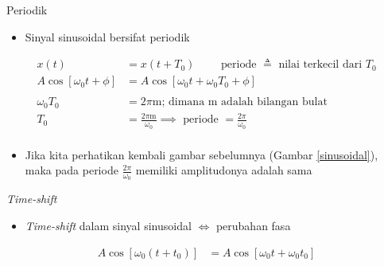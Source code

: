 \documentclass[aspectratio=169]{beamer}
\begin{document}
\begin{frame}{Periodik}
	\begin{itemize}
		\item Sinyal sinusoidal bersifat periodik
	\end{itemize}
	\begin{align*}
		x(t) &= x(t+T_0) \qquad \text{ periode } \triangleq \text{ nilai terkecil dari } T_0 \\
		A \cos[\omega_0 t + \phi] &= A \cos[\omega_0 t + \omega_0 T_0 + \phi] \\
		\\
		\omega_0 T_0 &= 2 \pi \text{m} \text{;   dimana m adalah bilangan bulat}\\ 
		T_0 &= \frac{2 \pi \text{m}}{\omega_0} \implies \text{ periode } = \frac{2 \pi}{\omega_0} \\
	\end{align*}
	\begin{itemize}
		\item Jika kita perhatikan kembali gambar sebelumnya (Gambar \ref{sinusoidal}), maka pada periode $ \frac{2 \pi}{\omega_0} $ memiliki amplitudonya adalah sama
	\end{itemize}
\end{frame}

\begin{frame}{\textit{Time-shift}}
	\begin{itemize}
		\item \textit{Time-shift} dalam sinyal sinusoidal $ \iff $ perubahan fasa
	\end{itemize}

	\begin{align*}
		A \cos [\omega_0 (t + t_0) ] &= A \cos [\omega_0 t + \omega_0 t_0 ] \\
	\end{align*}
\end{frame}
\end{document}
